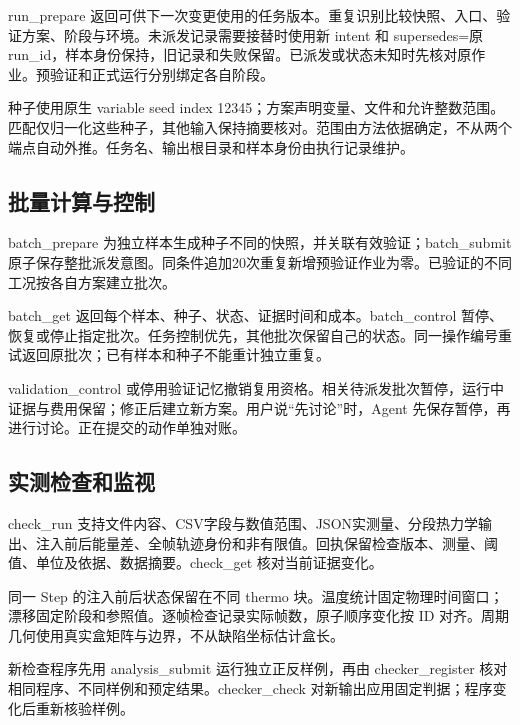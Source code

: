 \documentclass[11pt,a4paper]{ctexart}
\begin{document}
run\_\allowbreak{}prepare 返回可供下一次变更使用的任务版本。重复识别比较快照、入口、验证方案、阶段与环境。未派发记录需要接替时使用新 intent 和 supersedes=原run\_\allowbreak{}id，样本身份保持，旧记录和失败保留。已派发或状态未知时先核对原作业。预验证和正式运行分别绑定各自阶段。



种子使用原生 variable seed index 12345；方案声明变量、文件和允许整数范围。匹配仅归一化这些种子，其他输入保持摘要核对。范围由方法依据确定，不从两个端点自动外推。任务名、输出根目录和样本身份由执行记录维护。



\subsection{批量计算与控制}


batch\_\allowbreak{}prepare 为独立样本生成种子不同的快照，并关联有效验证；batch\_\allowbreak{}submit 原子保存整批派发意图。同条件追加20次重复新增预验证作业为零。已验证的不同工况按各自方案建立批次。



batch\_\allowbreak{}get 返回每个样本、种子、状态、证据时间和成本。batch\_\allowbreak{}control 暂停、恢复或停止指定批次。任务控制优先，其他批次保留自己的状态。同一操作编号重试返回原批次；已有样本和种子不能重计独立重复。



validation\_\allowbreak{}control 或停用验证记忆撤销复用资格。相关待派发批次暂停，运行中证据与费用保留；修正后建立新方案。用户说“先讨论”时，Agent 先保存暂停，再进行讨论。正在提交的动作单独对账。



\subsection{实测检查和监视}


check\_\allowbreak{}run 支持文件内容、CSV字段与数值范围、JSON实测量、分段热力学输出、注入前后能量差、全帧轨迹身份和非有限值。回执保留检查版本、测量、阈值、单位及依据、数据摘要。check\_\allowbreak{}get 核对当前证据变化。



同一 Step 的注入前后状态保留在不同 thermo 块。温度统计固定物理时间窗口；漂移固定阶段和参照值。逐帧检查记录实际帧数，原子顺序变化按 ID 对齐。周期几何使用真实盒矩阵与边界，不从缺陷坐标估计盒长。



新检查程序先用 analysis\_\allowbreak{}submit 运行独立正反样例，再由 checker\_\allowbreak{}register 核对相同程序、不同样例和预定结果。checker\_\allowbreak{}check 对新输出应用固定判据；程序变化后重新核验样例。
\end{document}
